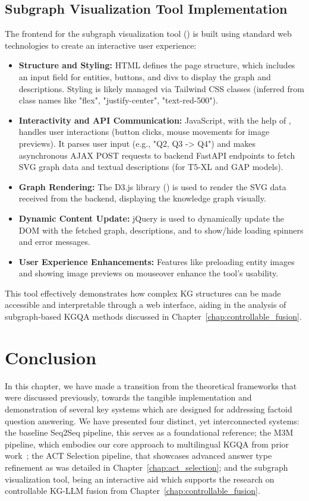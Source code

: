 \subsection{Subgraph Visualization Tool Implementation}
The frontend for the subgraph visualization tool () is built using standard web technologies to create an interactive user experience:
\begin{itemize}
    \item \textbf{Structure and Styling:} HTML defines the page structure, which includes an input field for entities, buttons, and divs to display the graph and descriptions. Styling is likely managed via Tailwind CSS classes (inferred from class names like "flex", "justify-center", "text-red-500").
    \item \textbf{Interactivity and API Communication:} JavaScript, with the help of , handles user interactions (button clicks, mouse movements for image previews). It parses user input (e.g., "Q2, Q3 -> Q4") and makes asynchronous AJAX POST requests to backend FastAPI endpoints to fetch SVG graph data and textual descriptions (for T5-XL and GAP models).
    \item \textbf{Graph Rendering:} The D3.js library () is used to render the SVG data received from the backend, displaying the knowledge graph visually.
    \item \textbf{Dynamic Content Update:} jQuery is used to dynamically update the DOM with the fetched graph, descriptions, and to show/hide loading spinners and error messages.
    \item \textbf{User Experience Enhancements:} Features like preloading entity images and showing image previews on mouseover enhance the tool's usability.
\end{itemize}
This tool effectively demonstrates how complex KG structures can be made accessible and interpretable through a web interface, aiding in the analysis of subgraph-based KGQA methods discussed in Chapter~\ref{chap:controllable_fusion}.

\section{Conclusion}
\label{sec:system_demos:conclusion}
In this chapter, we have made a transition from the theoretical frameworks that were discussed previously, towards the tangible implementation and demonstration of several key systems which are designed for addressing factoid question answering. We have presented four distinct, yet interconnected systems: the baseline Seq2Seq pipeline, this serves as a foundational reference; the M3M pipeline, which embodies our core approach to multilingual KGQA from prior work~\cite{DBLP:conf/acl/RazzhigaevSMBP23}; the ACT Selection pipeline, that showcases advanced answer type refinement as was detailed in Chapter~\ref{chap:act_selection}; and the subgraph visualization tool, being an interactive aid which supports the research on controllable KG-LLM fusion from Chapter~\ref{chap:controllable_fusion}.

